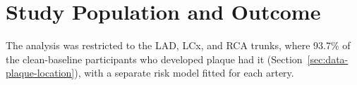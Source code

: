 \section{Study Population and Outcome}
\label{sec:method-population}

The analysis was restricted to the LAD, LCx, and RCA trunks, where 93.7\% of the clean-baseline participants who developed plaque had it (Section~\ref{sec:data-plaque-location}), with a separate risk model fitted for each artery.
